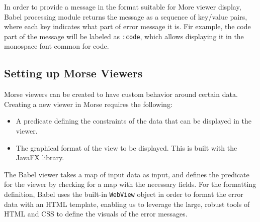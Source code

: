 \documentclass[12pt]{article}
\newcommand{\comment}[1]{}
\newcommand{\jwcomment}[1]{\textcolor{violet}{\comment{John: {#1}}}}
\begin{document}
In order to provide a message in the format suitable for More viewer display, Babel processing module returns the message as a sequence of key/value pairs, where each key indicates what part of error message it is. Fir example, the code part of the message will be labeled as \texttt{:code}, which allows displaying it in the monospace font common for code. 



\subsection{Setting up Morse Viewers}\label{subsec:Morse-Viewers}
Morse viewers can be created to have custom behavior around certain data.
Creating a new viewer in Morse requires the following:
\begin{itemize}
	\item A predicate defining the constraints of the data that can be displayed in the viewer.
	\item The graphical format of the view to be displayed. This is built with the JavaFX library. 
\end{itemize}
The Babel viewer takes a map of input data as input, and defines the predicate for the viewer by checking for a map with the necessary fields.
For the formatting definition, Babel uses the built-in \texttt{WebView} object in order to format the error data with an HTML template,
enabling us to leverage the large, robust tools of HTML and CSS to define the visuals of the error messages.
\end{document}
